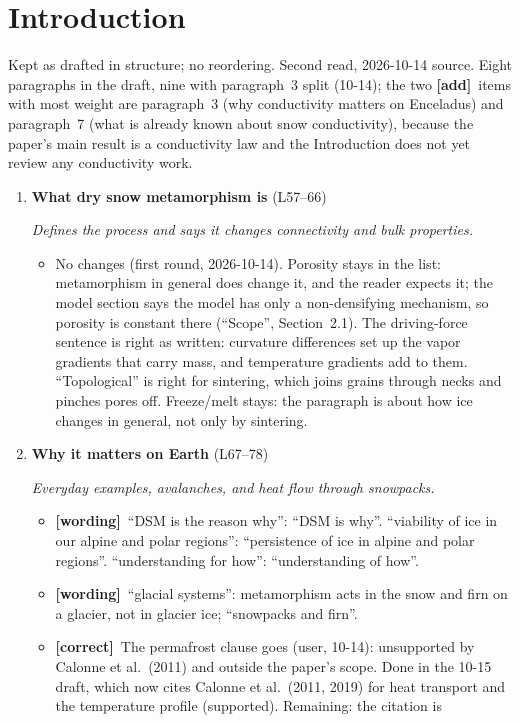 \documentclass[11pt]{article}
\newcommand{\Pg}[3]{\item \textbf{#1} {\small(#2)}\par\textit{#3}}
\newcommand{\tC}{\textcolor{miss}{\textbf{[correct]}}\ }
\newcommand{\tG}{\textcolor{stale}{\textbf{[wording]}}\ }
\newcommand{\tA}{\textcolor{have}{\textbf{[add]}}\ }
\newcommand{\add}[1]{\textcolor{revX}{#1}}
\begin{document}
\section{Introduction}
Kept as drafted in structure; no reordering. Second read, 2026-10-14 source.
Eight paragraphs in the draft, nine with paragraph~3 split (10-14); the two \tA items with most weight are paragraph~3 (why
conductivity matters on Enceladus) and paragraph~7 (what is already known
about snow conductivity), because the paper's main result is a conductivity
law and the Introduction does not yet review any conductivity work.
\begin{enumerate}
\Pg{What dry snow metamorphism is}{L57--66}{Defines the process and says it changes connectivity and bulk properties.}
  \begin{itemize}
  \item No changes (first round, 2026-10-14). Porosity stays in the list:
    metamorphism in general does change it, and the reader expects it; the
    model section says the model has only a non-densifying mechanism, so
    porosity is constant there (``Scope'', Section~2.1). The driving-force
    sentence is right as written: curvature differences set up the vapor
    gradients that carry mass, and temperature gradients add to them.
    ``Topological'' is right for sintering, which joins grains through necks
    and pinches pores off. Freeze/melt stays: the paragraph is about how ice
    changes in general, not only by sintering.
  \end{itemize}
\Pg{Why it matters on Earth}{L67--78}{Everyday examples, avalanches, and heat flow through snowpacks.}
  \begin{itemize}
  \item \tG ``DSM is the reason why'': ``DSM is why''. ``viability of ice in
    our alpine and polar regions'': ``persistence of ice in alpine and polar
    regions''. ``understanding for how'': ``understanding of how''.
  \item \tG ``glacial systems'': metamorphism acts in the snow and firn on a
    glacier, not in glacier ice; ``snowpacks and firn''.
  \item \tC The permafrost clause goes (user, 10-14): unsupported by Calonne
    et al.\ (2011) and outside the paper's scope. \add{Done in the 10-15
    draft, which now cites Calonne et al.\ (2011, 2019) for heat transport
    and the temperature profile (supported). Remaining: the citation is
}
\end{itemize}
\end{enumerate}
\end{document}
